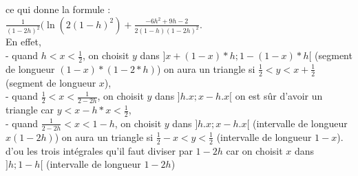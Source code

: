 \documentclass[a4paper,11pt]{book}
\begin{document}
ce qui donne la formule :\\
$\displaystyle \frac{1}{(1-2h)^2}(\ln(2(1-h)^2)+\frac{-6h^2+9h-2}{2(1-h)(1-2h)^2}$.\\
En effet, \\
- quand $\displaystyle h<x<\frac{1}{2}$, on choisit $y$ dans 
$]x+(1-x)*h;1-(1-x)*h[$ (segment de longueur $(1-x)*(1-2*h)$) on aura un triangle si $\frac{1}{2}<y<x+\frac{1}{2}$ (segment de longueur $x$), \\ 
- quand $\displaystyle \frac{1}{2}<x<\frac{1}{2-2h}$, on choisit $y$ dans $]h.x;x-h.x[$ on est s\^ur d'avoir un triangle car $y<x-h*x<\frac{1}{2}$,\\
- quand  $\displaystyle \frac{1}{2-2h}<x<1-h$, on choisit $y$ dans  $]h.x;x-h.x[$ (intervalle de longueur $x(1-2h)$)  on aura un
 triangle si $\displaystyle \frac{1}{2}-x<y<\frac{1}{2}$ (intervalle de longueur $1-x$).\\
d'ou les trois int\'egrales qu'il faut diviser par $1-2h$ car on choisit $x$
dans $]h;1-h[$ (intervalle de longueur $1-2h$)   
\end{document}
